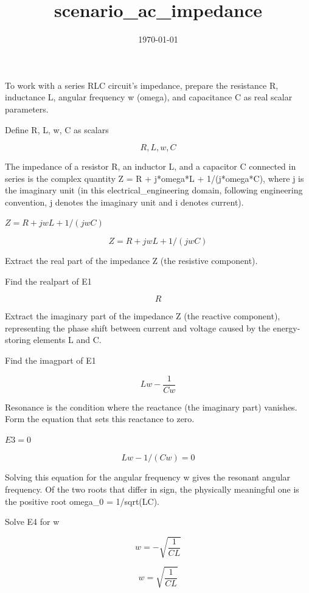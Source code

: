 \documentclass[dvipdfmx]{article}
\title{scenario\_ac\_impedance}
\date{\today}
\begin{document}
\maketitle

To work with a series RLC circuit's impedance, prepare the resistance R, inductance L, angular frequency w (omega), and capacitance C as real scalar parameters.

Define R, L, w, C as scalars

\[
  R, L, w, C
\]

The impedance of a resistor R, an inductor L, and a capacitor C connected in series is the complex quantity Z = R + j*omega*L + 1/(j*omega*C), where j is the imaginary unit (in this electrical\_engineering domain, following engineering convention, j denotes the imaginary unit and i denotes current).

$Z = R + j w L + 1/(j w C)$

\begin{equation}
  Z = R + j w L + 1/(j w C)
  \label{eq:E1}
\end{equation}

Extract the real part of the impedance Z (the resistive component).

Find the realpart of E1

\begin{equation}
  R
  \label{eq:E2}
\end{equation}

Extract the imaginary part of the impedance Z (the reactive component), representing the phase shift between current and voltage caused by the energy-storing elements L and C.

Find the imagpart of E1

\begin{equation}
  L w-\frac{1}{C w}
  \label{eq:E3}
\end{equation}

Resonance is the condition where the reactance (the imaginary part) vanishes. Form the equation that sets this reactance to zero.

$E3 = 0$

\begin{equation}
  L w-1/(C w) = 0
  \label{eq:E4}
\end{equation}

Solving this equation for the angular frequency w gives the resonant angular frequency. Of the two roots that differ in sign, the physically meaningful one is the positive root omega\_0 = 1/sqrt(LC).

Solve E4 for w

\begin{equation}
  w = -\sqrt{\frac{1}{C L}}
  \label{eq:E5}
\end{equation}

\begin{equation}
  w = \sqrt{\frac{1}{C L}}
  \label{eq:E6}
\end{equation}
\end{document}
